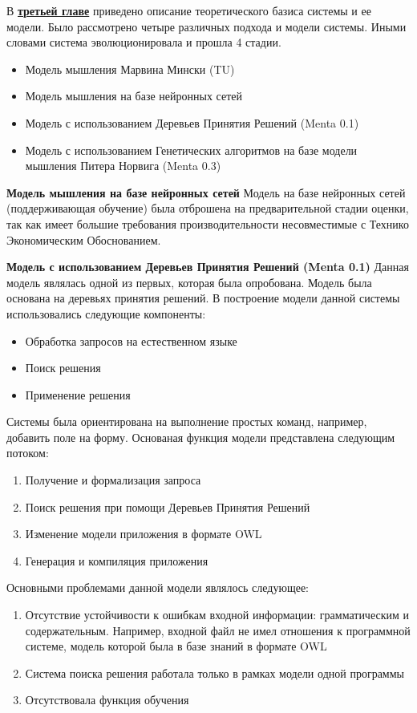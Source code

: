 \clearpage
В \underline{\textbf{третьей главе}} приведено описание теоретического базиса системы и ее модели. Было рассмотрено четыре различных подхода и модели системы. Иными словами система эволюционировала и прошла 4 стадии.
\begin{itemize}
	\item Модель мышления Марвина Мински (TU)
	\item Модель мышления на базе нейронных сетей 
	\item Модель с использованием Деревьев Принятия Решений (Menta 0.1)
	\item Модель с использованием Генетических алгоритмов на базе модели мышления Питера Норвига  (Menta 0.3)
\end{itemize}



\textbf{Модель мышления на базе нейронных сетей}
Модель на базе нейронных сетей (поддерживающая обучение) была отброшена на предварительной стадии оценки, так как имеет большие требования производительности несовместимые с Технико Экономическим Обоснованием.

\textbf{Модель с использованием Деревьев Принятия Решений (Menta 0.1)}
Данная модель являлась одной из первых, которая была опробована. Модель была основана на деревьях принятия решений. В построение модели данной системы использовались следующие компоненты:
\begin{itemize}
	\item Обработка запросов на естественном языке
	\item Поиск решения
	\item Применение решения
\end{itemize}
Системы была ориентирована на выполнение простых команд, например, добавить поле на форму. Основаная функция модели представлена следующим потоком:
\begin{enumerate}
	\item Получение и формализация запроса
	\item Поиск решения при помощи Деревьев Принятия Решений
	\item Изменение модели приложения в формате OWL
	\item Генерация и компиляция приложения
\end{enumerate}
Основными проблемами данной модели являлось следующее:
\begin{enumerate}
	\item Отсутствие устойчивости к ошибкам входной информации: грамматическим и содержательным. Например, входной файл не имел отношения к программной системе, модель которой была в базе знаний в формате OWL
	\item Система поиска решения работала только в рамках модели одной программы
	\item Отсутствовала функция обучения 
\end{enumerate}



